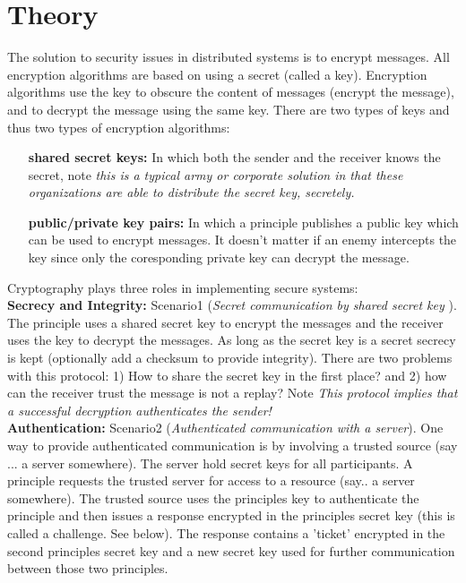 \section{Theory}


The solution to security issues in distributed systems is to encrypt messages. All encryption algorithms are based on using a secret (called a key). Encryption algorithms use the key to obscure the content of messages (encrypt the message), and to decrypt the message using the same key. There are two types of keys and thus two types of encryption algorithms: \\

\begin{itemize}
\item[  \textbf{shared secret keys:}] In which both the sender and the receiver knows the secret, note \textit{this is a typical army or corporate solution in that these organizations are able to distribute the secret key, secretely.}

\item[\textbf{public/private key pairs:}] In which a principle publishes a public key which can be used to encrypt messages. It doesn't matter if an enemy intercepts the key since only the coresponding private key can decrypt the message. \\
\end{itemize}

Cryptography plays three roles in implementing secure systems:\\

\textbf{Secrecy and Integrity:} Scenario1 (\textit{Secret communication by shared secret key }). The principle uses a shared secret key to encrypt the messages and the receiver uses the key to decrypt the messages. As long as the secret key is a secret secrecy is kept (optionally add a checksum to provide integrity). There are two problems with this protocol: 1) How to share the secret key in the first place? and 2) how can the receiver trust the message is not a replay? Note \textit{This protocol implies that a successful decryption authenticates the sender!} \\

\textbf{Authentication:} Scenario2 (\textit{Authenticated communication with a server}). One way to provide authenticated communication is by involving a trusted source (say ... a server somewhere). The server hold secret keys for all participants. A principle requests the trusted server for access to a resource (say.. a server somewhere). The trusted source uses the principles key to authenticate the principle and then issues a response encrypted in the principles secret key (this is called a challenge. See below). The response contains a 'ticket' encrypted in the second principles secret key and a new secret key used for further communication between those two principles. \\ 

